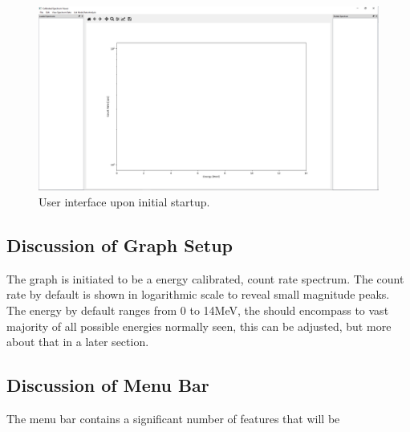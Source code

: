 \begin{figure}
	\centering
	\includegraphics[width=\linewidth]{Front_Panel.png}
	\caption{User interface upon initial startup.}
	\label{fig:opening}
\end{figure}
\subsection{Discussion of Graph Setup}
The graph is initiated to be a energy calibrated, count rate spectrum. The count rate by default is shown in logarithmic scale to reveal small magnitude peaks. The energy by default ranges from 0 to 14MeV, the should encompass to vast majority of all possible energies normally seen, this can be adjusted, but more about that in a later section. 
\subsection{Discussion of Menu Bar}
The menu bar contains a significant number of features that will be 